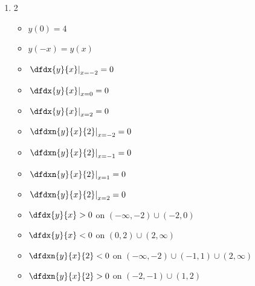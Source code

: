 \begin{ProblemSection}
\begin{embeddedproblem}{}
\begin{enumerate}[label={\bf{}(\alph*)}]
\begin{multicols}{2}
\begin{itemize}
        \item [ ] $\left.\dfdxn{y}{x}{2}\right|_{x=-3} = 0$
        \item [ ] $\left.\dfdxn{y}{x}{2}\right|_{x=3} = 0$
        \item [ ] $y<0$ on $(-\infty,\infty)$
        \item [ ] $\dfdx{y}{x}<0$ on $(-\infty,0)$
        \item [ ] $\dfdx{y}{x}>0$ on $(0,\infty)$
        \item [ ] $\dfdxn{y}{x}(2)<0$ on $(-\infty,-3)\cup(3,\infty)$
        \item [ ] $\dfdxn{y}{x}(2)>0$ on $(-3,3)$
        \end{itemize}
      \end{multicols}
    \item 
      \begin{multicols}{2}
        \begin{itemize}
        \item [ ] $y(0)=4$
        \item [ ] $y(-x)=y(x)$
        \item [ ] $\left.\dfdx{y}{x}\right|_{x=-2}=0$
        \item [ ] $\left.\dfdx{y}{x}\right|_{x= 0}=0$
        \item [ ] $\left.\dfdx{y}{x}\right|_{x= 2}=0$
        \item [ ] $\left.\dfdxn{y}{x}{2}\right|_{x=-2}=0$
        \item [ ] $\left.\dfdxn{y}{x}{2}\right|_{x=-1}=0$
        \item [ ] $\left.\dfdxn{y}{x}{2}\right|_{x= 1}=0$
        \item [ ] $\left.\dfdxn{y}{x}{2}\right|_{x= 2}=0$
        \item [ ] $\dfdx{y}{x}>0$ on $(-\infty,-2)\cup(-2,0)$
        \item [ ] $\dfdx{y}{x}<0$ on $(0,2)\cup(2,\infty)$
        \item [ ] $\dfdxn{y}{x}{2}<0$ on $(-\infty,-2)\cup(-1,1)\cup(2,\infty)$
        \item [ ] $\dfdxn{y}{x}{2}>0$ on $(-2,-1)\cup(1,2)$
        \end{itemize}
      \end{multicols}
    \end{enumerate}
  \end{embeddedproblem}
\end{ProblemSection}

